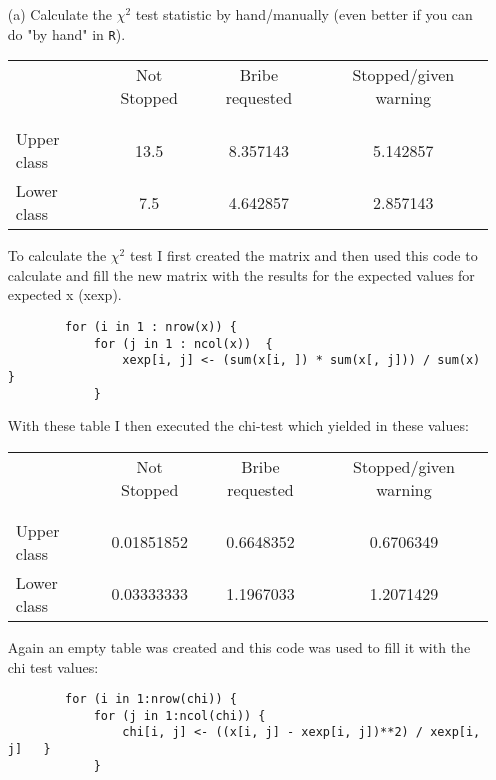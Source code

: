 \documentclass[12pt,letterpaper]{article}
\begin{document}
\begin{enumerate}
	
	\item [(a)]
	Calculate the $\chi^2$ test statistic by hand/manually (even better if you can do "by hand" in \texttt{R}).\\
	
	\begin{table}[h!]
		\centering
		\begin{tabular}{l | c c c }
			& Not Stopped & Bribe requested & Stopped/given warning \\
			\\[-1.8ex] 
			\hline \\[-1.8ex]
			Upper class & 13.5 & 8.357143 & 5.142857 \\
			Lower class & 7.5 & 4.642857 & 2.857143 \\
			\hline
		\end{tabular}
	\end{table}
	
	To calculate the $\chi^2$ test I first created the matrix and then used this code to calculate and fill the new matrix with the results for the expected values for expected x (xexp).
	
	\begin{verbatim}
		for (i in 1 : nrow(x)) {  
			for (j in 1 : ncol(x))	{    
				xexp[i, j] <- (sum(x[i, ]) * sum(x[, j])) / sum(x)  }
			}
	\end{verbatim}
	
	With these table I then executed the chi-test which yielded in these values:
		\begin{table}[h!]
		\centering
		\begin{tabular}{l | c c c }
			& Not Stopped & Bribe requested & Stopped/given warning \\
			\\[-1.8ex] 
			\hline \\[-1.8ex]
			Upper class & 0.01851852& 0.6648352 & 0.6706349 \\
			Lower class & 0.03333333 & 1.1967033 & 1.2071429 \\
			\hline
		\end{tabular}
	\end{table}
	
	Again an empty table was created and this code was used to fill it with the chi test values:
	\begin{verbatim}
		for (i in 1:nrow(chi)) {  
			for (j in 1:ncol(chi)) {    
				chi[i, j] <- ((x[i, j] - xexp[i, j])**2) / xexp[i, j]   }
			}
	\end{verbatim}
	

\end{enumerate}
\end{document}
